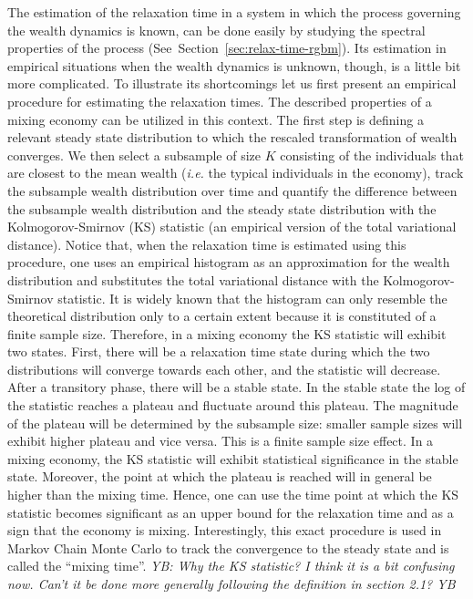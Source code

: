 \documentclass[11pt]{article}
\newcommand{\blue}[1]{{\color{blue} #1}}
\newcommand{\Sref}[1]{Section~\ref{sec:#1}}
\newcommand{\ie}{{\it i.e.}\xspace}
\newcommand{\YB}[1]{\blue{{\it YB: #1 YB}}}
\numberwithin{equation}{section}
\begin{document}
The estimation of the relaxation time in a system in which the process governing the wealth dynamics is known, can be done easily by studying the spectral properties of the process (See~\Sref{relax-time-rgbm}). Its estimation in empirical situations when the wealth dynamics is unknown, though, is a little bit more complicated. To illustrate its shortcomings let us first present an empirical procedure for estimating the relaxation times. The described properties of a mixing economy can be utilized in this context. The first step is defining a relevant steady state distribution to which the rescaled transformation of wealth converges. We then select a subsample of size $K$ consisting of the individuals that are closest to the mean wealth (\ie the typical individuals in the economy), track the subsample wealth distribution over time and quantify the difference between the subsample wealth distribution and the steady state distribution with the Kolmogorov-Smirnov (KS) statistic (an empirical version of the total variational distance). Notice that, when the relaxation time is estimated using this procedure, one uses an empirical histogram as an approximation for the wealth distribution and substitutes the total variational distance with the Kolmogorov-Smirnov  statistic. It is widely known that the histogram can only resemble the theoretical distribution only to a certain extent because it is constituted of a finite sample size. Therefore, in a mixing economy the KS statistic will exhibit two states. First, there will be a relaxation time state during which the two distributions will converge towards each other, and the statistic will decrease. After a transitory phase, there will be a stable state. In the stable state the log of the statistic reaches a plateau and fluctuate around this plateau. The magnitude of the plateau will be determined by the subsample size: smaller sample sizes will exhibit higher plateau and vice versa. This is a finite sample size effect. In a mixing economy, the KS statistic will exhibit statistical significance in the stable state. Moreover, the point at which the plateau is reached will in general be higher than the mixing time. Hence, one can use the time point at which the KS statistic becomes significant as an upper bound for the relaxation time and as a sign that the economy is mixing. Interestingly, this exact procedure is used in Markov Chain Monte Carlo to track the convergence to the steady state and is called the ``mixing time''.
\YB{Why the KS statistic? I think it is a bit confusing now. Can't it be done more generally following the definition in section 2.1?}
\end{document}
